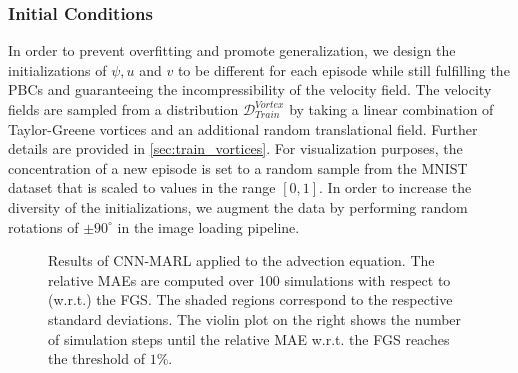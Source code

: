 \documentclass{article}
\theoremstyle{plain}
\theoremstyle{definition}
\theoremstyle{remark}
\begin{document}
\subsubsection{Initial Conditions}
In order to prevent overfitting and promote  generalization, we design the initializations of $\psi, u$ and $v$ to be different for each episode while still fulfilling the PBCs and guaranteeing the incompressibility of the velocity field. 
The velocity fields are sampled from a distribution $\mathcal D^{Vortex}_{Train}$ by taking a linear combination of Taylor-Greene vortices and an additional random translational field. Further details are provided in \cref{sec:train_vortices}. For visualization purposes, the concentration of a new episode is set to a random sample from the MNIST dataset \cite{mnist} that is scaled to values in the range $[0, 1]$. In order to increase the diversity of the initializations, we augment the data by performing random rotations of $\pm 90 ^{\circ}$ in the image loading pipeline.
\begin{figure} 
\centering
    \caption{Results of CNN-MARL applied to the advection equation. The relative MAEs are computed over 100 simulations with respect to (w.r.t.) the FGS. The shaded regions correspond to the respective standard deviations. The violin plot on the right shows the number of simulation steps until the relative MAE w.r.t. the FGS reaches the threshold of $1\%$.}
    \label{fig:advection_rollout}
\end{figure}
\end{document}
